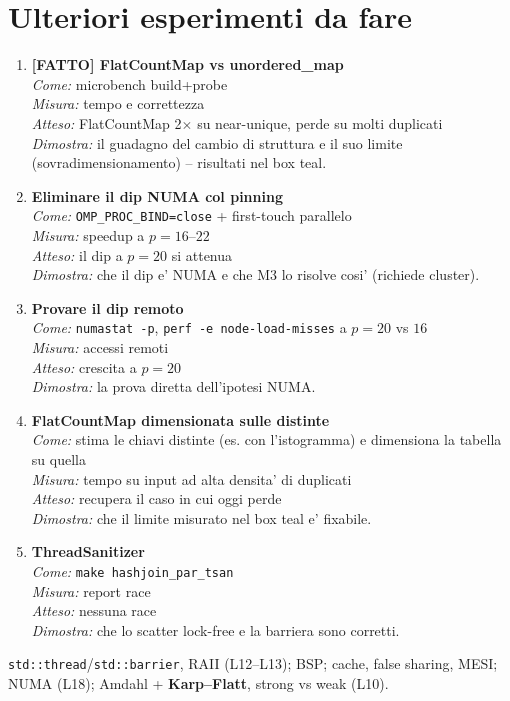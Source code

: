 \documentclass[11pt,a4paper]{article}
\newcommand{\espitem}[5]{\item \textbf{#1}\\ \emph{Come:} #2\\ \emph{Misura:} #3\\ \emph{Atteso:} #4\\ \emph{Dimostra:} #5}
\begin{document}
\section{Ulteriori esperimenti da fare}

\begin{espbox}
\begin{enumerate}[leftmargin=1.3em]
\espitem{[FATTO] FlatCountMap vs unordered\_map}
  {microbench build+probe}{tempo e correttezza}{FlatCountMap 2$\times$ su near-unique, perde su molti duplicati}
  {il guadagno del cambio di struttura e il suo limite (sovradimensionamento) -- risultati nel box teal.}
\espitem{Eliminare il dip NUMA col pinning}{\texttt{OMP\_PROC\_BIND=close} + first-touch parallelo}{speedup a $p=16$--$22$}
  {il dip a $p=20$ si attenua}{che il dip e' NUMA e che M3 lo risolve cosi' (richiede cluster).}
\espitem{Provare il dip remoto}{\texttt{numastat -p}, \texttt{perf -e node-load-misses} a $p=20$ vs $16$}{accessi remoti}
  {crescita a $p=20$}{la prova diretta dell'ipotesi NUMA.}
\espitem{FlatCountMap dimensionata sulle distinte}{stima le chiavi distinte (es. con l'istogramma) e dimensiona la tabella su quella}{tempo su input ad alta densita' di duplicati}
  {recupera il caso in cui oggi perde}{che il limite misurato nel box teal e' fixabile.}
\espitem{ThreadSanitizer}{\texttt{make hashjoin\_par\_tsan}}{report race}{nessuna race}
  {che lo scatter lock-free e la barriera sono corretti.}
\end{enumerate}
\end{espbox}

\begin{theorybox}
\texttt{std::thread}/\texttt{std::barrier}, RAII (L12--L13); BSP; cache, false sharing, MESI; NUMA (L18); Amdahl + \textbf{Karp--Flatt}, strong vs weak (L10).
\end{theorybox}
\end{document}
